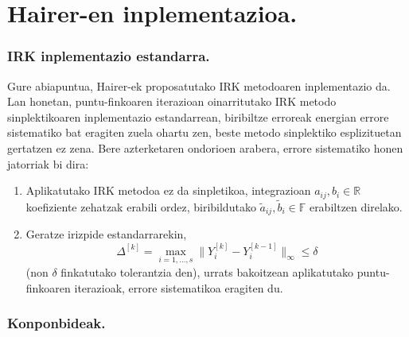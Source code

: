 \section{Hairer-en inplementazioa.}

\subsubsection*{IRK inplementazio estandarra.}

Gure abiapuntua, Hairer-ek \cite{Hairer2008} proposatutako IRK metodoaren inplementazio da.  
Lan honetan, puntu-finkoaren iterazioan oinarritutako IRK metodo sinplektikoaren  inplementazio estandarrean, biribiltze erroreak energian errore sistematiko bat eragiten zuela ohartu zen, beste metodo sinplektiko esplizituetan gertatzen ez zena. Bere azterketaren ondorioen arabera, errore sistematiko honen jatorriak bi dira:

\begin{enumerate}
 \item Aplikatutako IRK metodoa ez da sinpletikoa, integrazioan $a_{ij}, b_i \in \mathbb{R}$ koefiziente zehatzak erabili ordez, biribildutako $\tilde a_{ij},\tilde b_i \in \mathbb{F}$ erabiltzen direlako. 
\item Geratze irizpide estandarrarekin, 
\begin{equation}
\Delta ^{[k]} = \max_{i=1,\dots,s}\|Y_i^{[k]}-Y_i^{[k-1]}\|_{\infty} \leqslant \delta
\end{equation}
(non $\delta$ finkatutako tolerantzia den), urrats bakoitzean aplikatutako puntu-finkoaren iterazioak,  errore sistematikoa eragiten du.

\end{enumerate}    

\subsubsection*{Konponbideak.}

